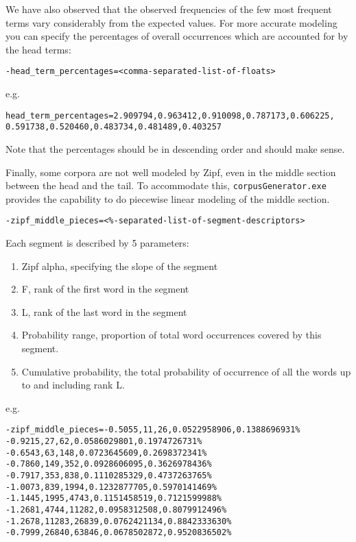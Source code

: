 \documentclass{article}
\newcommand{\gac}{\texttt{corpusGenerator.exe~}}
\begin{document}
We have also observed that the observed frequencies of the few most
frequent terms vary considerably from the expected values.  For more
accurate modeling you can specify the percentages of overall
occurrences which are accounted for by the head terms:
\begin{verbatim}
-head_term_percentages=<comma-separated-list-of-floats>
\end{verbatim}
e.g.
\begin{verbatim}
head_term_percentages=2.909794,0.963412,0.910098,0.787173,0.606225,
0.591738,0.520460,0.483734,0.481489,0.403257
\end{verbatim}

Note that the percentages should be in descending order and should
make sense.

Finally, some corpora are not well modeled by Zipf, even in the middle
section between the head and the tail.   To accommodate this, \gac
provides the capability to do piecewise linear modeling of the middle
section.
\begin{verbatim}
-zipf_middle_pieces=<%-separated-list-of-segment-descriptors>
\end{verbatim}
Each segment is described by 5 parameters:
\begin{enumerate}
\item Zipf alpha, specifying the slope of the segment
\item F, rank of the first word in the segment
\item L, rank of the last word in the segment
\item Probability range, proportion of total word occurrences
  covered by this segment.
\item Cumulative probability, the total probability of occurrence
  of all the words up to and including rank L.
\end{enumerate}
e.g.
\begin{verbatim}
-zipf_middle_pieces=-0.5055,11,26,0.0522958906,0.1388696931%
-0.9215,27,62,0.0586029801,0.1974726731%
-0.6543,63,148,0.0723645609,0.2698372341%
-0.7860,149,352,0.0928606095,0.3626978436%
-0.7917,353,838,0.1110285329,0.4737263765%
-1.0073,839,1994,0.1232877705,0.5970141469%
-1.1445,1995,4743,0.1151458519,0.7121599988%
-1.2681,4744,11282,0.0958312508,0.8079912496%
-1.2678,11283,26839,0.0762421134,0.8842333630%
-0.7999,26840,63846,0.0678502872,0.9520836502%
\end{verbatim}
\end{document}
